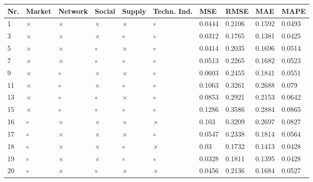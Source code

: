 \begin{table}[H]
\centering
\begin{tabular}{|P{0.7cm}|P{1.3cm}P{1.3cm}P{1.3cm}P{1.3cm}P{1.3cm}|P{1.1cm}P{1.1cm}P{1.1cm}P{1.1cm}|}
\hline
 Nr. &   Market &  Network &   Social &   Supply & Techn. Ind. &             MSE &           RMSE &             MAE &            MAPE \\
 & $\times$ & $\times$ & $\times$ & $\times$ &     $\circ$ &          0.0444 &         0.2106 &          0.1592 &          0.0493 \\
   3 & $\times$ & $\times$ & $\times$ &  $\circ$ &     $\circ$ &          0.0312 &         0.1765 &          0.1381 &          0.0425 \\
   5 & $\times$ & $\times$ &  $\circ$ & $\times$ &     $\circ$ &          0.0414 &         0.2035 &          0.1696 &          0.0514 \\
   7 & $\times$ & $\times$ &  $\circ$ &  $\circ$ &     $\circ$ &          0.0513 &         0.2265 &          0.1682 &          0.0523 \\
   9 & $\times$ &  $\circ$ & $\times$ & $\times$ &     $\circ$ &          0.0603 &         0.2455 &          0.1841 &          0.0551 \\
  11 & $\times$ &  $\circ$ & $\times$ &  $\circ$ &     $\circ$ &          0.1063 &         0.3261 &          0.2688 &           0.079 \\
  13 & $\times$ &  $\circ$ &  $\circ$ & $\times$ &     $\circ$ &          0.0853 &         0.2921 &          0.2153 &          0.0642 \\
  15 & $\times$ &  $\circ$ &  $\circ$ &  $\circ$ &     $\circ$ &          0.1286 &         0.3586 &          0.2884 &          0.0865 \\
  16 &  $\circ$ & $\times$ & $\times$ & $\times$ &    $\times$ &           0.103 &         0.3209 &          0.2697 &          0.0827 \\
  17 &  $\circ$ & $\times$ & $\times$ & $\times$ &     $\circ$ &          0.0547 &         0.2338 &          0.1814 &          0.0564 \\
  18 &  $\circ$ & $\times$ & $\times$ &  $\circ$ &    $\times$ &            0.03 &         0.1732 &          0.1413 &          0.0428 \\
  19 &  $\circ$ & $\times$ & $\times$ &  $\circ$ &     $\circ$ &          0.0328 &         0.1811 &          0.1395 &          0.0428 \\
  20 &  $\circ$ & $\times$ &  $\circ$ & $\times$ &    $\times$ &          0.0456 &         0.2136 &          0.1684 &          0.0527 \\

\end{tabular}
\end{table}
